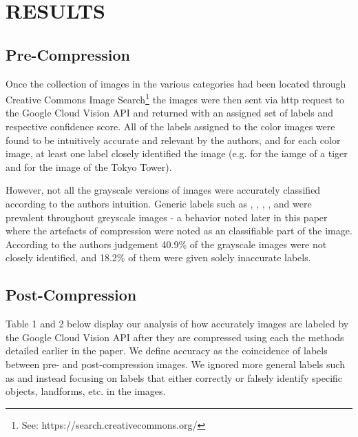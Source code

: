 \documentclass[letterpaper, 10 pt, conference]{ieeeconf}  %
\begin{document}
\vspace*{3mm}

\section{RESULTS}

\subsection{Pre-Compression}

Once the collection of images in the various categories had been located through Creative Commons Image Search\footnote{See: https://search.creativecommons.org/} the images were then sent via http request to the Google Cloud Vision API and returned with an assigned set of labels and respective confidence score.
All of the labels assigned to the color images were
found to be intuitively accurate and relevant by the authors, and for each color image,
at least one label closely identified the image (e.g. 
for the iamge of a tiger and  for the image of
the Tokyo Tower).

However, not all the grayscale versions of images were accurately classified according to the authors intuition.
Generic labels such as , , , ,
and  were prevalent throughout greyscale images - a behavior noted later in this paper where the artefacts of compression were noted as an classifiable part of the image. According to the authors judgement 40.9\% of the grayscale images
were not closely identified, and 18.2\% of them were given solely inaccurate labels.

\subsection{Post-Compression}

Table 1 and 2 below display our analysis of how accurately images are labeled by the
Google Cloud Vision API after they are compressed using each
the methods detailed earlier in the paper. We define accuracy as the coincidence of labels between pre- and post-compression images.  We ignored more general
labels such as  
and  instead focusing on labels that either correctly or falsely
identify specific objects, landforms, etc. in the images.

\vspace*{2mm}
\end{document}
